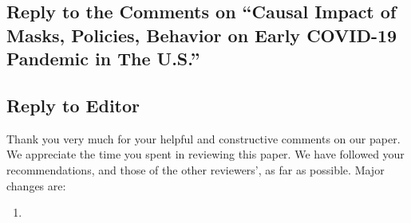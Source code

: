 \documentclass[11pt]{article}
\begin{document}
\newcommand{\replytitle}
{
\subsection*{Reply to the Comments on  ``Causal Impact of Masks, Policies, Behavior on Early COVID-19 Pandemic in The U.S.''}
}

\newcommand{\refreplyheading}
{Thank you very much for your helpful and constructive comments on our paper. We appreciate the time you spent in reviewing this paper. We have followed your recommendations, and those of the other reviewers', as far as possible.
Major changes are:}
 

\newcommand{\changes}
{
\begin{enumerate}

\item   
\end{enumerate}

}

\replytitle
\subsection*{Reply to Editor}
\refreplyheading
 
\changes
\end{document}
